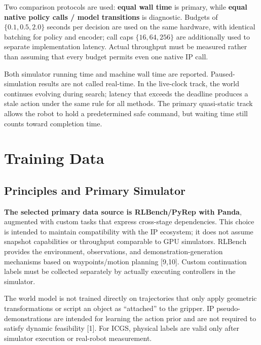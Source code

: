 \documentclass[
  10pt,
]{article}
\begin{document}
Two comparison protocols are used: \textbf{equal wall time} is primary, while \textbf{equal native policy calls / model transitions} is diagnostic. Budgets of \(\{0.1,0.5,2.0\}\) seconds per decision are used on the same hardware, with identical batching for policy and encoder; call caps \(\{16,64,256\}\) are additionally used to separate implementation latency. Actual throughput must be measured rather than assuming that every budget permits even one native IP call.

Both simulator running time and machine wall time are reported. Paused-simulation results are not called real-time. In the live-clock track, the world continues evolving during search; latency that exceeds the deadline produces a stale action under the same rule for all methods. The primary quasi-static track allows the robot to hold a predetermined safe command, but waiting time still counts toward completion time.

\hypertarget{dux1eef-liux1ec7u-huux1ea5n-luyux1ec7n}{%
\section{Training Data}\label{dux1eef-liux1ec7u-huux1ea5n-luyux1ec7n}}

\hypertarget{nguyuxean-tux1eafc-vuxe0-simulator-chuxednh}{%
\subsection{Principles and Primary Simulator}\label{nguyuxean-tux1eafc-vuxe0-simulator-chuxednh}}

\textbf{The selected primary data source is RLBench/PyRep with Panda}, augmented with custom tasks that express cross-stage dependencies. This choice is intended to maintain compatibility with the IP ecosystem; it does not assume snapshot capabilities or throughput comparable to GPU simulators. RLBench provides the environment, observations, and demonstration-generation mechanisms based on waypoints/motion planning {[}9,10{]}. Custom continuation labels must be collected separately by actually executing controllers in the simulator.

The world model is not trained directly on trajectories that only apply geometric transformations or script an object as ``attached'' to the gripper. IP pseudo-demonstrations are intended for learning the action prior and are not required to satisfy dynamic feasibility {[}1{]}. For ICGS, physical labels are valid only after simulator execution or real-robot measurement.
\end{document}
